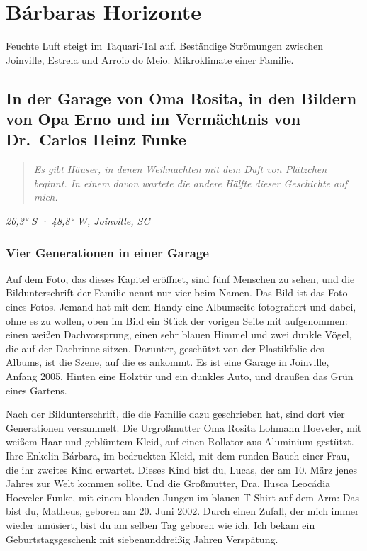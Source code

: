 \documentclass[
  ngerman,
  11pt,
  openany]{book}
\newenvironment{boletim}{\begin{center}\begin{minipage}{0.85\linewidth}\small\itshape}{\end{minipage}\end{center}}
\begin{document}
\part{Bárbaras Horizonte}\label{buxe1rbaras-horizonte}

\begin{boletim}

Feuchte Luft steigt im Taquari-Tal auf. Beständige Strömungen zwischen
Joinville, Estrela und Arroio do Meio. Mikroklimate einer Familie.

\end{boletim}

\chapter{In der Garage von Oma Rosita, in den Bildern von Opa Erno und
im Vermächtnis von Dr.~Carlos Heinz Funke}\label{cap-11}

\begin{quote}
\emph{Es gibt Häuser, in denen Weihnachten mit dem Duft von Plätzchen
beginnt. In einem davon wartete die andere Hälfte dieser Geschichte auf
mich.}
\end{quote}

\emph{26,3° S · 48,8° W, Joinville, SC}

\section{Vier Generationen in einer
Garage}\label{vier-generationen-in-einer-garage}

Auf dem Foto, das dieses Kapitel eröffnet, sind fünf Menschen zu sehen,
und die Bildunterschrift der Familie nennt nur vier beim Namen. Das Bild
ist das Foto eines Fotos. Jemand hat mit dem Handy eine Albumseite
fotografiert und dabei, ohne es zu wollen, oben im Bild ein Stück der
vorigen Seite mit aufgenommen: einen weißen Dachvorsprung, einen sehr
blauen Himmel und zwei dunkle Vögel, die auf der Dachrinne sitzen.
Darunter, geschützt von der Plastikfolie des Albums, ist die Szene, auf
die es ankommt. Es ist eine Garage in Joinville, Anfang 2005. Hinten
eine Holztür und ein dunkles Auto, und draußen das Grün eines Gartens.

Nach der Bildunterschrift, die die Familie dazu geschrieben hat, sind
dort vier Generationen versammelt. Die Urgroßmutter Oma Rosita Lohmann
Hoeveler, mit weißem Haar und geblümtem Kleid, auf einen Rollator aus
Aluminium gestützt. Ihre Enkelin Bárbara, im bedruckten Kleid, mit dem
runden Bauch einer Frau, die ihr zweites Kind erwartet. Dieses Kind bist
du, Lucas, der am 10. März jenes Jahres zur Welt kommen sollte. Und die
Großmutter, Dra. Ilusca Leocádia Hoeveler Funke, mit einem blonden
Jungen im blauen T-Shirt auf dem Arm: Das bist du, Matheus, geboren am
20. Juni 2002. Durch einen Zufall, der mich immer wieder amüsiert, bist
du am selben Tag geboren wie ich. Ich bekam ein Geburtstagsgeschenk mit
siebenunddreißig Jahren Verspätung.
\end{document}
